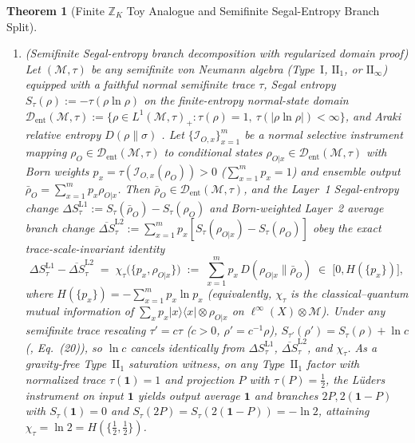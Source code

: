 \documentclass[11pt,a4paper]{article}
\newtheorem{theorem}{Theorem}
\theoremstyle{definition}
\theoremstyle{remark}
\newcommand{\cD}{\mathcal{D}}
\newcommand{\cI}{\mathcal{I}}
\newcommand{\cM}{\mathcal{M}}
\newcommand{\bbZ}{\mathbb{Z}}
\newcommand{\1}{\mathbf{1}}
\begin{document}
\begin{theorem}[Finite $\bbZ_K$ Toy Analogue and Semifinite Segal-Entropy Branch Split]
\begin{enumerate}
  \item[(b)] \emph{(Semifinite Segal-entropy branch decomposition with regularized domain proof)} Let $(\cM,\tau)$ be any semifinite von Neumann algebra (Type~$\mathrm{I}$, $\mathrm{II}_1$, or $\mathrm{II}_\infty$) equipped with a faithful normal semifinite trace $\tau$, Segal entropy $S_\tau(\rho):=-\tau(\rho\ln\rho)$ \cite{Segal1960,LongoWitten2023} on the finite-entropy normal-state domain $\cD_{\mathrm{ent}}(\cM,\tau):=\{\rho\in L^1(\cM,\tau)_+ : \tau(\rho)=1,\ \tau(|\rho\ln\rho|)<\infty\}$, and Araki relative entropy $D(\rho\|\sigma)$ \cite{Araki1976,Araki1977}. Let $\{\cI_{O,x}\}_{x=1}^m$ be a normal selective instrument mapping $\rho_O\in\cD_{\mathrm{ent}}(\cM,\tau)$ to conditional states $\rho_{O|x}\in\cD_{\mathrm{ent}}(\cM,\tau)$ with Born weights $p_x=\tau(\cI_{O,x}(\rho_O))>0$ ($\sum_{x=1}^m p_x=1$) and ensemble output $\bar{\rho}_O=\sum_{x=1}^m p_x\rho_{O|x}$. Then $\bar{\rho}_O\in\cD_{\mathrm{ent}}(\cM,\tau)$, and the Layer~1 Segal-entropy change $\Delta S_\tau^{\mathrm{L1}}:=S_\tau(\bar{\rho}_O)-S_\tau(\rho_O)$ and Born-weighted Layer~2 average branch change $\overline{\Delta S}_\tau^{\mathrm{L2}}:=\sum_{x=1}^m p_x[S_\tau(\rho_{O|x})-S_\tau(\rho_O)]$ obey the exact \emph{trace-scale-invariant} identity
  \begin{equation}\label{eq:type2-branch-decomp}
    \Delta S_\tau^{\mathrm{L1}} - \overline{\Delta S}_\tau^{\mathrm{L2}}
    \;=\; \chi_\tau\bigl(\{p_x,\rho_{O|x}\}\bigr)
    \;:=\; \sum_{x=1}^m p_x\,D(\rho_{O|x}\|\bar{\rho}_O)
    \;\in\; \bigl[0, H(\{p_x\})\bigr],
  \end{equation}
  where $H(\{p_x\})=-\sum_{x=1}^m p_x\ln p_x$ (equivalently, $\chi_\tau$ is the classical--quantum mutual information of $\sum_x p_x|x\rangle\langle x|\otimes\rho_{O|x}$ on $\ell^\infty(X)\otimes\cM$). Under any semifinite trace rescaling $\tau'=c\tau$ ($c>0$, $\rho'=c^{-1}\rho$), $S_{\tau'}(\rho')=S_\tau(\rho)+\ln c$ (\cite{LongoWitten2023}, Eq.~(20)), so $\ln c$ cancels identically from $\Delta S_\tau^{\mathrm{L1}}$, $\overline{\Delta S}_\tau^{\mathrm{L2}}$, and $\chi_\tau$. As a gravity-free Type~$\mathrm{II}_1$ saturation witness, on any Type~$\mathrm{II}_1$ factor with normalized trace $\tau(\1)=1$ and projection $P$ with $\tau(P)=\frac{1}{2}$, the L\"uders instrument on input $\1$ yields output average $\1$ and branches $2P, 2(\1-P)$ with $S_\tau(\1)=0$ and $S_\tau(2P)=S_\tau(2(\1-P))=-\ln 2$, attaining $\chi_\tau=\ln 2=H(\{\frac{1}{2},\frac{1}{2}\})$.
\end{enumerate}
\end{theorem}
\end{document}
